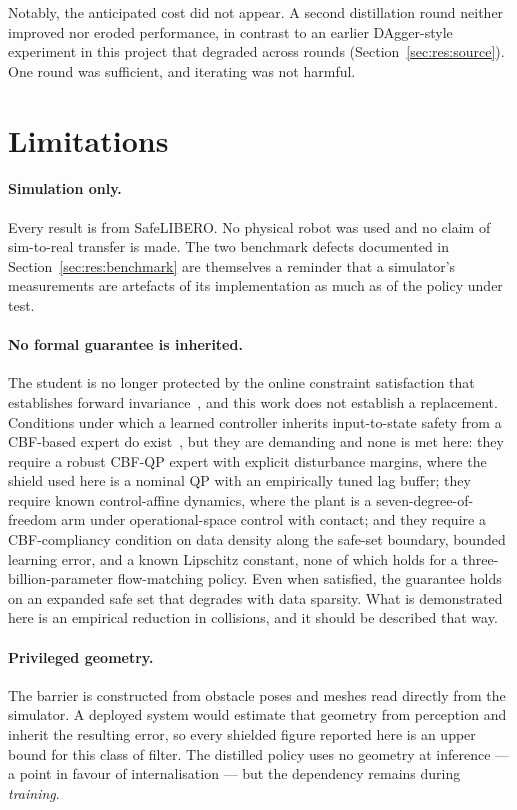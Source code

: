 Notably, the anticipated cost did not appear. A second distillation round neither improved nor
eroded performance, in contrast to an earlier DAgger-style experiment in this project that degraded
across rounds (Section~\ref{sec:res:source}). One round was sufficient, and iterating was not
harmful.

\section{Limitations}\label{sec:disc:limitations}

\paragraph{Simulation only.}
Every result is from SafeLIBERO. No physical robot was used and no claim of sim-to-real transfer is
made. The two benchmark defects documented in Section~\ref{sec:res:benchmark} are themselves a
reminder that a simulator's measurements are artefacts of its implementation as much as of the
policy under test.

\paragraph{No formal guarantee is inherited.}
The student is no longer protected by the online constraint satisfaction that establishes forward
invariance~\cite{ames2017cbf}, and this work does not establish a replacement. Conditions under
which a learned controller inherits input-to-state safety from a CBF-based expert do
exist~\cite{cosner2022il_cbf}, but they are demanding and none is met here: they require a robust
CBF-QP expert with explicit disturbance margins, where the shield used here is a nominal QP with an
empirically tuned lag buffer; they require known control-affine dynamics, where the plant is a
seven-degree-of-freedom arm under operational-space control with contact; and they require a
CBF-compliancy condition on data density along the safe-set boundary, bounded learning error, and a
known Lipschitz constant, none of which holds for a three-billion-parameter flow-matching policy.
Even when satisfied, the guarantee holds on an expanded safe set that degrades with data sparsity.
What is demonstrated here is an empirical reduction in collisions, and it should be described that
way.

\paragraph{Privileged geometry.}
The barrier is constructed from obstacle poses and meshes read directly from the simulator. A
deployed system would estimate that geometry from perception and inherit the resulting error, so
every shielded figure reported here is an upper bound for this class of filter. The distilled
policy uses no geometry at inference --- a point in favour of internalisation --- but the
dependency remains during \emph{training}.

